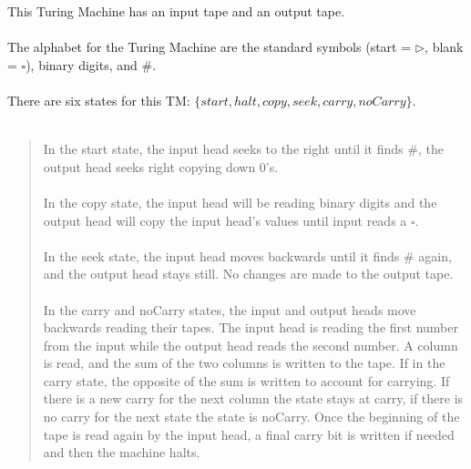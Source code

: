 \documentclass[letterpaper,notitlepage,twoside]{article}
\begin{document}
This Turing Machine has an input tape and an output tape.\\\\
The alphabet for the Turing Machine are the standard symbols (start = $\triangleright$, blank = $\square$), binary digits, and $\#$.\\\\
There are six states for this TM: $\{start, halt, copy, seek, carry, noCarry\}$.\\\\
\begin{quote}
In the start state, the input head seeks to the right until it finds $\#$, the output head seeks right copying down 0's.\\\\
In the copy state, the input head will be reading binary digits and the output head will copy the input head's values until input reads a $\square$.\\\\
In the seek state, the input head moves backwards until it finds $\#$ again, and the output head stays still. No changes are made to the output tape.\\\\
In the carry and noCarry states, the input and output heads move backwards reading their tapes. The input head is reading the first number from the input while the output head reads the second number. A column is read, and the sum of the two columns is written to the tape. If in the carry state, the opposite of the sum is written to account for carrying. If there is a new carry for the next column the state stays at carry, if there is no carry for the next state the state is noCarry. Once the beginning of the tape is read again by the input head, a final carry bit is written if needed and then the machine halts.
\end{quote}
\end{document}
